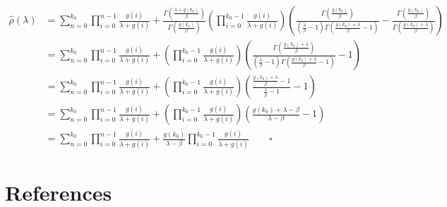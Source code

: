 \documentclass[
  sn-basic,
]{sn-jnl}
\theoremstyle{plain}
\theoremstyle{remark}
\begin{document}
\begin{align*}
\hat\rho(\lambda) &= \sum_{n=0}^{k_0}\prod_{i=0}^{n-1}\frac{g(i)}{\lambda+g(i)} + \frac{\Gamma\left(\frac{\lambda+g(k_0)}{\beta}\right)}{\Gamma\left(\frac{g(k_0)}{\beta}\right)}\left(\prod_{i=0}^{k_0-1}\frac{g(i)}{\lambda+g(i)}\right)\left(\frac{\Gamma\left(\frac{g(k_0)}{\beta}\right)}{\left(\frac{\lambda}{\beta}-1\right)\Gamma\left(\frac{g(k_0)+\lambda}{\beta}-1\right)}-\frac{\Gamma\left(\frac{g(k_0)}{\beta}\right)}{\Gamma\left(\frac{g(k_0)+\lambda}{\beta}\right)}\right)\\
&=\sum_{n=0}^{k_0}\prod_{i=0}^{n-1}\frac{g(i)}{\lambda+g(i)} + \left(\prod_{i=0}^{k_0-1}\frac{g(i)}{\lambda+g(i)}\right)\left(\frac{\Gamma\left(\frac{g(k_0)+\lambda}{\beta}\right)}{\left(\frac{\lambda}{\beta}-1\right)\Gamma\left(\frac{g(k_0)+\lambda}{\beta}-1\right)}-1\right)\\
&=\sum_{n=0}^{k_0}\prod_{i=0}^{n-1}\frac{g(i)}{\lambda+g(i)} + \left(\prod_{i=0}^{k_0-1}\frac{g(i)}{\lambda+g(i)}\right)\left(\frac{\frac{g(k_0)+\lambda}{\beta}-1}{\frac{\lambda}{\beta}-1}-1\right)\\
&=\sum_{n=0}^{k_0}\prod_{i=0}^{n-1}\frac{g(i)}{\lambda+g(i)} + \left(\prod_{i=0}^{k_0-1}\frac{g(i)}{\lambda+g(i)}\right)\left(\frac{g(k_0)+\lambda-\beta}{\lambda-\beta}-1\right)\\&=\sum_{n=0}^{k_0}\prod_{i=0}^{n-1}\frac{g(i)}{\lambda+g(i)} + \frac{g(k_0)}{\lambda-\beta}\prod_{i=0}^{k_0-1}\frac{g(i)}{\lambda+g(i)}\qquad \square
\end{align*}

\section{References}\label{references}

\renewcommand{\bibsection}{}

\end{document}
